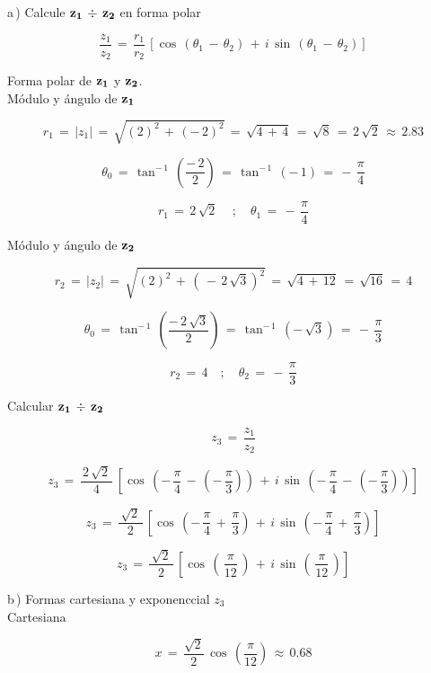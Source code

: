 \documentclass[a4paper,11pt,openany]{book}
\begin{document}
\textcolor{ao(english)}{a\,)} Calcule $\bf{z_{1}\,\div\,z_{2}}$ en forma polar

$$\dfrac{z_{1}}{z_{2}}\,=\,\dfrac{r_{1}}{r_{2}}\,\left[\cos\,(\theta_{1}\,-\,\theta_{2})\,+\,i\,\sin\,(\theta_{1}\,-\,\theta_{2})\right]$$

\textcolor{ao(english)}{} Forma polar de $\bf{z_{1}}$ y $\bf{z_{2}}$.\\

\textcolor{ao(english)}{} Módulo y ángulo de $\bf{z_{1}}$ 

$$r_{1}\,=\,|z_{1}|\,=\,\sqrt{(2)^{2}\,+\,(-\,2)^{2}}\,=\,\sqrt{4\,+\,4}\,=\,\sqrt{8}\,=\,2\,\sqrt{2}\,\approx\,2.83$$

$$\theta_{0}\,=\,\tan^{-\,1}\,\left(\dfrac{-\,2}{2}\right)\,=\,\tan^{-\,1}\,(-\,1)\,=\,-\,\dfrac{\pi}{4}$$

$$\boxed{r_{1}\,=\,2\,\sqrt{2}\, \quad;\quad \theta_{1}\,=\,-\,\dfrac{\pi}{4}}$$

\textcolor{ao(english)}{} Módulo y ángulo de $\bf{z_{2}}$ 

$$r_{2}\,=\,|z_{2}|\,=\,\sqrt{(2)^{2}\,+\,(\,-\,2\,\sqrt{3})^{2}}\,=\,\sqrt{4\,+\,12}\,=\,\sqrt{16}\,=\,4$$

$$\theta_{0}\,=\,\tan^{-\,1}\,\left(\dfrac{-\,2\,\sqrt{3}}{2}\right)\,=\,\tan^{-\,1}\,(-\,\sqrt{3})\,=\,-\,\dfrac{\pi}{3}$$

$$\boxed{r_{2}\,=\,4 \quad;\quad \theta_{2}\,=\,-\,\dfrac{\pi}{3}}$$

\textcolor{ao(english)}{} Calcular $\bf{z_{1}\,\div\,z_{2}}$

$$z_{3}\,=\,\dfrac{z_{1}}{z_{2}}$$

$$z_{3}\,=\,\dfrac{\,2\,\sqrt{2}\,}{4}\,\left[\cos\,\left(-\,\dfrac{\pi}{4}\,-\,\left(-\,\dfrac{\pi}{3}\right)\right)\,+\,i\,\sin\,\left(-\,\dfrac{\pi}{4}\,-\,\left(-\,\dfrac{\pi}{3}\right)\right)\right]$$

$$z_{3}\,=\,\dfrac{\,\sqrt{2}\,}{2}\,\left[\cos\,\left(-\,\dfrac{\pi}{4}\,+\,\dfrac{\pi}{3}\right)\,+\,i\,\sin\,\left(-\,\dfrac{\pi}{4}\,+\,\dfrac{\pi}{3}\right)\right]$$

$$z_{3}\,=\,\dfrac{\,\sqrt{2}\,}{2}\,\left[\cos\,\left(\,\dfrac{\pi}{12}\,\right)\,+\,i\,\sin\,\left(\,\dfrac{\pi}{12}\,\right)\right]$$

\textcolor{ao(english)}{b\,)} Formas cartesiana y exponenccial $z_{3}$\\

\textcolor{ao(english)}{} Cartesiana

$$x\,=\,\dfrac{\sqrt{2}}{2}\,\cos\,\left(\dfrac{\pi}{12}\right)\,\approx\,0.68$$
\end{document}
